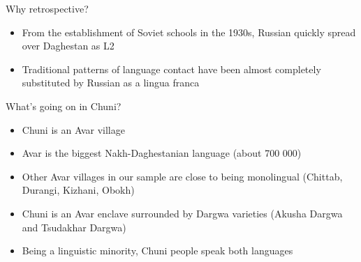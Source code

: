\documentclass[13pt, t]{beamer}
\begin{document}
\begin{frame}{Why retrospective?}
\begin{itemize}
\item From the establishment of Soviet schools in the 1930s,  Russian quickly spread over Daghestan as L2
\item Traditional patterns of language contact have been almost completely substituted by Russian as a lingua franca
\end{itemize}
\end{frame}











\begin{frame}{What’s going on in Chuni?}
\begin{itemize}
\item Chuni is an Avar village
\item Avar is the biggest Nakh-Daghestanian language (about 700 000)
\item Other Avar villages in our sample are close to being monolingual (Chittab, Durangi, Kizhani, Obokh)
\item Chuni is an Avar enclave surrounded by Dargwa varieties (Akusha Dargwa and Tsudakhar Dargwa)
\item Being a linguistic minority, Chuni people speak both languages
\end{itemize}
\end{frame}
\end{document}
